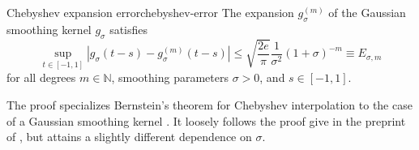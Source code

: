 \documentclass[12pt]{article}
\begin{document}
\begin{lemma}{Chebyshev expansion error}{chebyshev-error}
    The expansion $g_{\sigma}^{(m)}$ of the Gaussian smoothing kernel $g_{{\sigma}}$  satisfies
    \begin{equation}
        \sup_{t \in [-1, 1]} \left| g_{\sigma}(t - s) - g_{\sigma}^{(m)}(t - s) \right| \leq \sqrt{\frac{2e}{\pi}} \frac{1}{\sigma^2} (1 + \sigma)^{-m} \equiv E_{\sigma, m}
        \label{equ:chebyshev-interpolation-sup-error-kernel}
    \end{equation}
    for all degrees $m \in \mathbb{N}$, smoothing parameters $\sigma > 0$, and $s \in [-1, 1]$.
\end{lemma}

The proof specializes Bernstein's theorem for Chebyshev interpolation to the case of a Gaussian smoothing kernel . It loosely follows the proof give in the preprint of \cite[theorem 2]{lin-2017-randomized-estimation}, but attains a slightly different dependence on $\sigma$.
\end{document}
